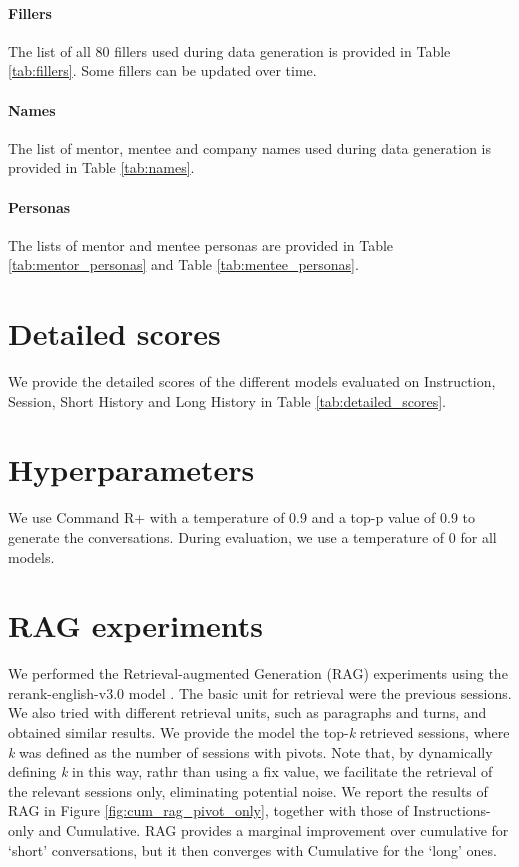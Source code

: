 \paragraph{Fillers} The list of all 80 fillers used during data generation is provided in Table \ref{tab:fillers}. Some fillers can be updated over time.

\paragraph{Names} The list of mentor, mentee and company names used during data generation is provided in Table \ref{tab:names}.

\paragraph{Personas} The lists of mentor and mentee personas are provided in Table \ref{tab:mentor_personas} and Table \ref{tab:mentee_personas}.


\section{Detailed scores}
\label{sec:detailed_scores}
We provide the detailed scores of the different models evaluated on Instruction, Session,  Short History and Long History in Table \ref{tab:detailed_scores}. 

\section{Hyperparameters}
\label{app:hyperparameters}
We use Command R+ with a temperature of 0.9 and a top-p value of 0.9 to generate the conversations. During evaluation, we use a temperature of 0 for all models. 

\section{RAG experiments}
\label{app:rag_experiments}
We performed the Retrieval-augmented Generation (RAG) experiments using the rerank-english-v3.0 model \citep{coherererank2024}. The basic unit for retrieval were the previous sessions. We also tried with different retrieval units, such as paragraphs and turns, and obtained similar results. 
We provide the model the top-\textit{k} retrieved sessions, where \textit{k} was defined as the number of sessions with pivots. Note that, by dynamically defining \textit{k} in this way, rathr than using a fix value, we facilitate the retrieval of the relevant sessions only, eliminating potential noise.
We report the results of RAG in Figure \ref{fig:cum_rag_pivot_only}, together with those of Instructions-only and Cumulative. RAG provides a marginal improvement over cumulative for `short' conversations, but it then converges with Cumulative for the `long' ones.

